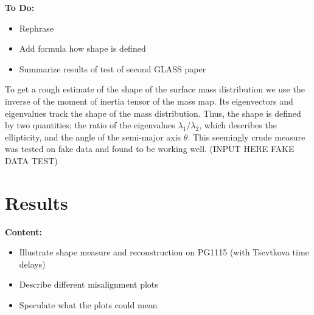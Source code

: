 \documentclass[useAMS,usenatbib]{mn2e}
\begin{document}
\textbf{To Do:}
\begin{itemize}
\item Rephrase
\item Add formula how shape is defined
\item Summarize results of test of second GLASS paper
\end{itemize}

To get a rough estimate of the shape of the surface mass distribution we use the inverse of the moment of inertia tensor of the mass map. Its eigenvectors and eigenvalues track the shape of the mass distribution. Thus, the shape is defined by two quantities; the ratio of the eigenvalues $\lambda_{1}/\lambda_{2}$, which describes the ellipticity, and the angle of the semi-major axis $\theta$. This seemingly crude measure was tested on fake data and found to be working well. (INPUT HERE FAKE DATA TEST)



\section{Results}\label{sec:results}
\textbf{Content:}
\begin{itemize}
\item Illustrate shape measure and reconstruction on PG1115 (with Tsevtkova time delays)
\item Describe different misalignment plots
\item Speculate what the plots could mean
\end{itemize}
\end{document}

